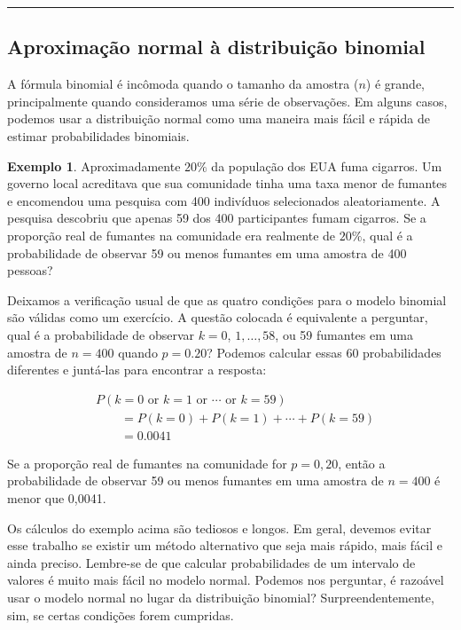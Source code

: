 \documentclass[
]{book}
\theoremstyle{definition}
\theoremstyle{definition}
\newtheorem{example}{Exemplo}[chapter]
\theoremstyle{definition}
\theoremstyle{definition}
\theoremstyle{remark}
\begin{document}
\begin{center}\rule{0.5\linewidth}{0.5pt}\end{center}

\hypertarget{normalApproximationBinomialDistribution}{%
\subsection{Aproximação normal à distribuição binomial}\label{normalApproximationBinomialDistribution}}

A fórmula binomial é incômoda quando o tamanho da amostra (\(n\)) é grande, principalmente quando consideramos uma série de observações. Em alguns casos, podemos usar a distribuição normal como uma maneira mais fácil e rápida de estimar probabilidades binomiais.

\begin{example}
\protect\hypertarget{exm:unnamed-chunk-137}{}{\label{exm:unnamed-chunk-137} }Aproximadamente \(20\%\) da população dos EUA fuma cigarros. Um governo local acreditava que sua comunidade tinha uma taxa menor de fumantes e encomendou uma pesquisa com 400 indivíduos selecionados aleatoriamente. A pesquisa descobriu que apenas 59 dos 400 participantes fumam cigarros. Se a proporção real de fumantes na comunidade era realmente de \(20\%\), qual é a probabilidade de observar 59 ou menos fumantes em uma amostra de 400 pessoas?
\end{example}

Deixamos a verificação usual de que as quatro condições para o modelo binomial são válidas como um exercício. A questão colocada é equivalente a perguntar, qual é a probabilidade de observar \(k=0\), \(1,\dots,58\), ou 59 fumantes em uma amostra de \(n=400\) quando \(p=0.20\)? Podemos calcular essas 60 probabilidades diferentes e juntá-las para encontrar a resposta:

\begin{align*}
&P(k=0\text{ or }k=1\text{ or }\cdots\text{ or } k=59) \\
    &\qquad= P(k=0) + P(k=1) + \cdots + P(k=59) \\
    &\qquad=0.0041
\end{align*}

Se a proporção real de fumantes na comunidade for \(p=0,20\), então a probabilidade de observar 59 ou menos fumantes em uma amostra de \(n=400\) é menor que 0,0041.

Os cálculos do exemplo acima são tediosos e longos. Em geral, devemos evitar esse trabalho se existir um método alternativo que seja mais rápido, mais fácil e ainda preciso. Lembre-se de que calcular probabilidades de um intervalo de valores é muito mais fácil no modelo normal. Podemos nos perguntar, é razoável usar o modelo normal no lugar da distribuição binomial? Surpreendentemente, sim, se certas condições forem cumpridas.
\end{document}
